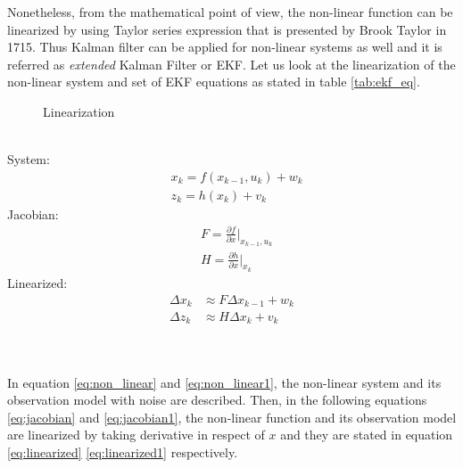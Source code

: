 \par Nonetheless, from the mathematical point of view, the non-linear function can be linearized by using Taylor series expression %
that is presented by  Brook Taylor in 1715. 
Thus Kalman filter can be applied for non-linear systems as well and it is referred as \textit{extended} Kalman Filter or EKF. Let us look at the linearization of the non-linear system and set of EKF equations as stated in table \ref{tab:ekf_eq}.\\
\vspace{-1.0cm}
\begin{wrapfigure}[15]{l}{0.4\textwidth}
  \begin{center}
  \end{center}
  \vspace{-18pt}
  \caption{Linearization}
  \label{fig:linearization}
\end{wrapfigure}
\vspace{10pt}
\\
\hspace{-16pt}
System:
\vspace{-20pt}
\begin{align}\label{eq:non_linear}
    &x_k=f(x_{k-1},u_k)+w_k\\
    &z_k=h(x_k)+v_k  \label{eq:non_linear1} 
\end{align}
\vspace{-10pt}
Jacobian:
\vspace{-20pt}
\begin{align}\label{eq:jacobian}
&F=\frac{\partial f}{\partial x}|_{x_{k-1},u_k}\\
&H=\frac{\partial h}{\partial x}|_{x_k}\label{eq:jacobian1}   
\end{align}
\vspace{-20pt}
Linearized:
\vspace{-6pt}
\begin{align}\label{eq:linearized}
\Delta x_k &\approx F\Delta x_{k-1} + w_k\\
\Delta z_k &\approx H\Delta x_{k} + v_k\label{eq:linearized1}
\end{align}
\\
\\
\par In equation \eqref{eq:non_linear} and \eqref{eq:non_linear1}, the non-linear system and its observation model with noise are described. Then, in the following equations \eqref{eq:jacobian} and \eqref{eq:jacobian1}, the non-linear function and its observation model are linearized by taking derivative in respect of $x$ and they are stated in equation \eqref{eq:linearized} \eqref{eq:linearized1} respectively.
